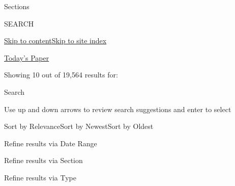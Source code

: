 Sections

SEARCH

\protect\hyperlink{site-content}{Skip to
content}\protect\hyperlink{site-index}{Skip to site index}

\href{https://myaccount.nytimes.com/auth/login?response_type=cookie\&client_id=vi}{}

\href{https://www.nytimes.com/section/todayspaper}{Today's Paper}

Showing 10 out of 19,564 results for:

Search

Use up and down arrows to review search suggestions and enter to select

Sort by RelevanceSort by NewestSort by Oldest

Refine results via Date Range

Refine results via Section

Refine results via Type


